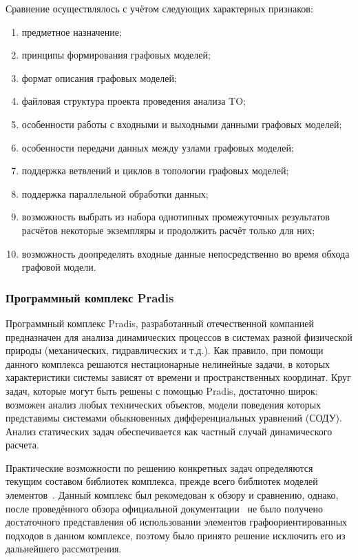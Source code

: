 Сравнение осуществлялось с учётом следующих характерных признаков:
\begin{enumerate}[label=\arabic*)]
    \item предметное назначение;
    \item принципы формирования графовых моделей;
    \item формат описания графовых моделей;
    \item файловая структура проекта проведения анализа \gls{TO};
    \item особенности работы с входными и выходными данными графовых моделей;
    \item особенности передачи данных между узлами графовых моделей;
    \item поддержка ветвлений и циклов в топологии графовых моделей;
    \item поддержка параллельной обработки данных;
    \item возможность выбрать из набора однотипных промежуточных результатов расчётов некоторые экземпляры и продолжить расчёт только для них;
    \item возможность доопределять входные данные непосредственно во время обхода графовой модели.
\end{enumerate}

\subsubsection{Программный комплекс Pradis}

Программный комплекс \textsf{Pradis}, разработанный отечественной компанией \frqq\, предназначен для анализа динамических процессов в системах разной физической природы (механических, гидравлических и т.д.). Как правило, при помощи данного комплекса решаются нестационарные нелинейные задачи, в которых характеристики системы зависят от времени и пространственных координат. Круг задач, которые могут быть решены с помощью \textsf{Pradis}, достаточно широк: возможен анализ любых технических объектов, модели поведения которых представимы системами обыкновенных дифференциальных уравнений (СОДУ). Анализ статических задач обеспечивается как частный случай динамического расчета.

Практические возможности по решению конкретных задач определяются текущим составом библиотек комплекса, прежде всего библиотек моделей элементов~\cite{PradisGeneral2007}. Данный комплекс был рекомедован к обзору и сравнению, однако, после проведённого обзора официальной документации~\cite{PradisMethods2007} не было получено достаточного представления об использовании элементов графоориентированных подходов в данном комплексе, поэтому было принято решение исключить его из дальнейшего рассмотрения.

